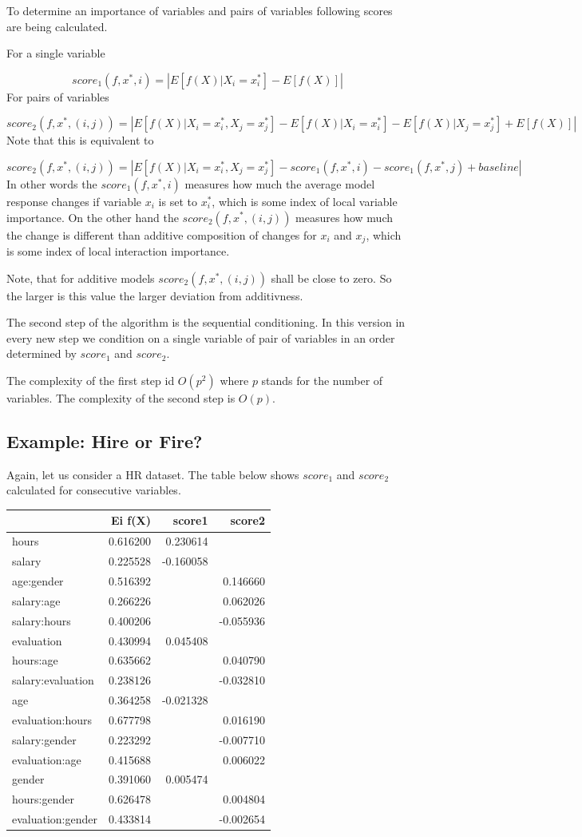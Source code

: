\documentclass[]{krantz}
\theoremstyle{definition}
\theoremstyle{definition}
\theoremstyle{definition}
\theoremstyle{remark}
\begin{document}
To determine an importance of variables and pairs of variables following
scores are being calculated.

For a single variable

\[
score_1(f, x^*, i) = \left| E [f(X)|X_i = x^*_i]  - E [f(X)]\right|
\] For pairs of variables

\[
score_2(f, x^*, (i,j)) = \left| E [f(X)|X_i = x^*_i, X_j = x^*_j] - E [f(X)|X_i = x^*_i] - E [f(X)| X_j = x^*_j]+ E [f(X)] \right|
\] Note that this is equivalent to

\[
score_2(f, x^*, (i,j)) = \left| E [f(X)|X_i = x^*_i, X_j = x^*_j] - score_1 (f, x^*, i) - score_1 (f, x^*, j) + baseline \right|
\] In other words the \(score_1(f, x^*, i)\) measures how much the
average model response changes if variable \(x_i\) is set to \(x_i^*\),
which is some index of local variable importance. On the other hand the
\(score_2(f, x^*, (i,j))\) measures how much the change is different
than additive composition of changes for \(x_i\) and \(x_j\), which is
some index of local interaction importance.

Note, that for additive models \(score_2(f, x^*, (i,j))\) shall be close
to zero. So the larger is this value the larger deviation from
additivness.

The second step of the algorithm is the sequential conditioning. In this
version in every new step we condition on a single variable of pair of
variables in an order determined by \(score_1\) and \(score_2\).

The complexity of the first step id \(O(p^2)\) where \(p\) stands for
the number of variables. The complexity of the second step is \(O(p)\).

\hypertarget{example-hire-or-fire-1}{%
\subsection{Example: Hire or Fire?}\label{example-hire-or-fire-1}}

Again, let us consider a HR dataset. The table below shows \(score_1\)
and \(score_2\) calculated for consecutive variables.

\begin{longtable}[]{@{}lrrr@{}}
\toprule
& Ei f(X) & score1 & score2\tabularnewline
\midrule
\endhead
hours & 0.616200 & 0.230614 &\tabularnewline
salary & 0.225528 & -0.160058 &\tabularnewline
age:gender & 0.516392 & & 0.146660\tabularnewline
salary:age & 0.266226 & & 0.062026\tabularnewline
salary:hours & 0.400206 & & -0.055936\tabularnewline
evaluation & 0.430994 & 0.045408 &\tabularnewline
hours:age & 0.635662 & & 0.040790\tabularnewline
salary:evaluation & 0.238126 & & -0.032810\tabularnewline
age & 0.364258 & -0.021328 &\tabularnewline
evaluation:hours & 0.677798 & & 0.016190\tabularnewline
salary:gender & 0.223292 & & -0.007710\tabularnewline
evaluation:age & 0.415688 & & 0.006022\tabularnewline
gender & 0.391060 & 0.005474 &\tabularnewline
hours:gender & 0.626478 & & 0.004804\tabularnewline
evaluation:gender & 0.433814 & & -0.002654\tabularnewline
\bottomrule
\end{longtable}
\end{document}
